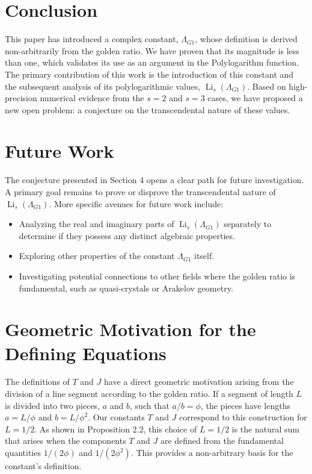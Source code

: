 \documentclass{amsart}
\theoremstyle{plain}
\theoremstyle{definition}
\theoremstyle{remark}
\DeclareMathOperator{\Li}{Li} %
\newcommand{\LambdaG}{\Lambda_{G1}}
\begin{document}
\section{Conclusion}
This paper has introduced a complex constant, $\LambdaG$, whose definition is derived non-arbitrarily from the golden ratio.
We have proven that its magnitude is less than one, which validates its use as an argument in the Polylogarithm function.
The primary contribution of this work is the introduction of this constant and the subsequent analysis of its polylogarithmic values, $\Li_s(\LambdaG)$.
Based on high-precision numerical evidence from the $s=2$ and $s=3$ cases, we have proposed a new open problem: a conjecture on the transcendental nature of these values.

\section{Future Work}
The conjecture presented in Section 4 opens a clear path for future investigation.
A primary goal remains to prove or disprove the transcendental nature of $\Li_s(\LambdaG)$.
More specific avenues for future work include:
\begin{itemize}
    \item Analyzing the real and imaginary parts of $\Li_s(\LambdaG)$ separately to determine if they possess any distinct algebraic properties.
    \item Exploring other properties of the constant $\LambdaG$ itself.
    \item Investigating potential connections to other fields where the golden ratio is fundamental, such as quasi-crystals or Arakelov geometry.
\end{itemize}

\appendix
\section{Geometric Motivation for the Defining Equations}
\label{app:A}
The definitions of $T$ and $J$ have a direct geometric motivation arising from the division of a line segment according to the golden ratio.
If a segment of length $L$ is divided into two pieces, $a$ and $b$, such that $a/b = \phi$, the pieces have lengths $a=L/\phi$ and $b=L/\phi^2$.
Our constants $T$ and $J$ correspond to this construction for $L=1/2$.
As shown in Proposition 2.2, this choice of $L=1/2$ is the natural sum that arises when the components $T$ and $J$ are defined from the fundamental quantities $1/(2\phi)$ and $1/(2\phi^2)$.
This provides a non-arbitrary basis for the constant's definition.
\end{document}
